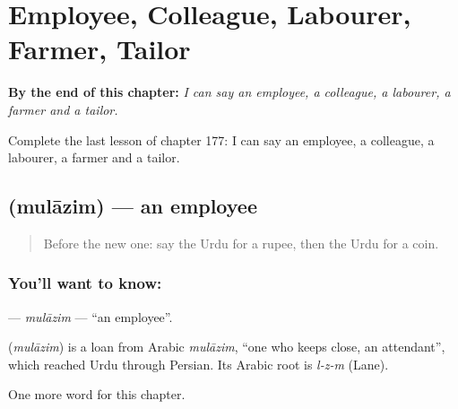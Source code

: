 
\chapter{Employee, Colleague, Labourer, Farmer, Tailor}
\label{ch:ur-employee-colleague-labourer-farmer-tailor}

\begin{chapteropening}
\textbf{By the end of this chapter:} \emph{I can say an employee, a colleague, a labourer, a farmer and a tailor.}

Complete the last lesson of chapter 177: I can say an employee, a colleague, a labourer, a farmer and a tailor.
\end{chapteropening}

\section[\texorpdfstring{\ur{ملازم} (mulāzim)}{ملازم (mulāzim)}]{ (mulāzim) — an employee}

\label{lesson:UR-C177-mulazim}



\begin{quote}
Before the new one: say the Urdu for a rupee, then the Urdu for a coin.
\end{quote}

\subsection*{You'll want to know: }
\textbf{} — \emph{mulāzim} — \textquotedblleft{}an employee\textquotedblright{}.

\begin{cousinweb}
\textbf{} (\emph{mulāzim}) is a loan from Arabic \emph{mulāzim}, \textquotedblleft{}one who keeps close, an attendant\textquotedblright{}, which reached Urdu through Persian. Its Arabic root is \emph{l-z-m} (Lane).
\end{cousinweb}

\begin{grammarlens}[title={What you've built}]
One more word for this chapter.
\end{grammarlens}

